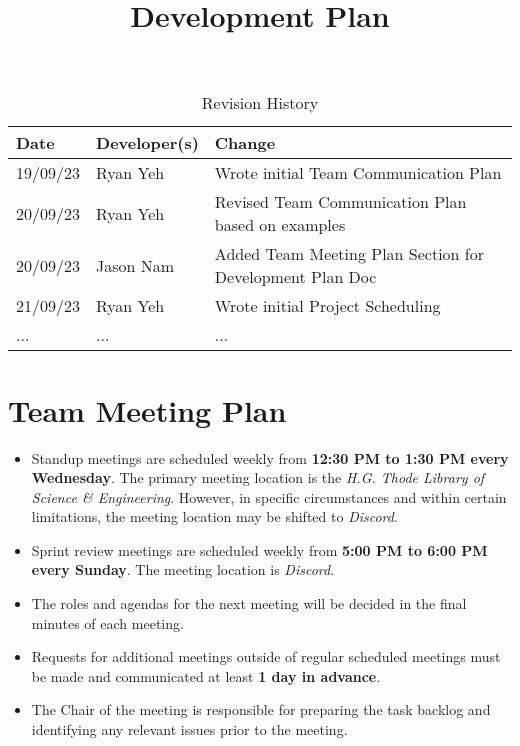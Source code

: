 \documentclass{article}
\title{Development Plan\\\progname}
\author{\authname}
\date{}
\begin{document}
\maketitle

\begin{table}[hp]
\caption{Revision History} \label{TblRevisionHistory}
\begin{tabularx}{\textwidth}{llX}
\toprule
\textbf{Date} & \textbf{Developer(s)} & \textbf{Change}\\
\midrule
19/09/23 & Ryan Yeh & Wrote initial Team Communication Plan\\
20/09/23 & Ryan Yeh & Revised Team Communication Plan based on examples\\
20/09/23 & Jason Nam & Added Team Meeting Plan Section for Development Plan Doc\\
21/09/23 & Ryan Yeh & Wrote initial Project Scheduling\\
... & ... & ...\\
\bottomrule
\end{tabularx}
\end{table}


\section{Team Meeting Plan}

\begin{itemize}
	\item Standup meetings are scheduled weekly from \textbf{12:30 PM to 1:30 PM every Wednesday}. The primary meeting location is the \emph{H.G. Thode Library of Science \& Engineering}. However, in specific circumstances and within certain limitations, the meeting location may be shifted to \emph{Discord}.
    	\item Sprint review meetings are scheduled weekly from \textbf{5:00 PM to 6:00 PM every Sunday}. The meeting location is \emph{Discord}.
    	\item The roles and agendas for the next meeting will be decided in the final minutes of each meeting.
    	\item Requests for additional meetings outside of regular scheduled meetings must be made and communicated at least \textbf{1 day in advance}.
   	\item The Chair of the meeting is responsible for preparing the task backlog and identifying any relevant issues prior to the meeting.
\end{itemize}
\end{document}
